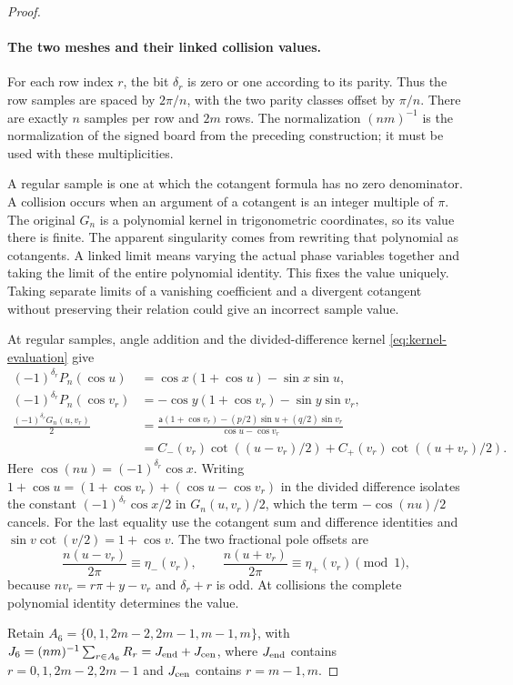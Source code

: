 \begin{proof}
\paragraph{The two meshes and their linked collision values.}
For each row index $r$, the bit $\delta_r$ is zero or one according
to its parity. Thus the row samples are spaced by $2\pi/n$, with
the two parity classes offset by $\pi/n$. There are exactly $n$
samples per row and $2m$ rows. The normalization $(nm)^{-1}$ is the
normalization of the signed board from the preceding construction;
it must be used with these multiplicities.

A regular sample is one at which the cotangent formula has no zero
denominator. A collision occurs when an argument of a cotangent is an
integer multiple of $\pi$. The original $G_n$ is a polynomial kernel
in trigonometric coordinates, so its value there is finite. The apparent
singularity comes from rewriting that polynomial as cotangents. A
linked limit means varying the actual phase variables together and
taking the limit of the entire polynomial identity. This fixes the
value uniquely. Taking separate limits of a vanishing coefficient and
a divergent cotangent without preserving their relation could give an
incorrect sample value.

At regular samples, angle addition and the divided-difference kernel
\eqref{eq:kernel-evaluation} give
\[
 \begin{aligned}
 (-1)^{\delta_r}P_n(\cos u)&=\cos x(1+\cos u)-\sin x\sin u,\\
 (-1)^{\delta_r}P_n(\cos v_r)&=-\cos y(1+\cos v_r)-\sin y\sin v_r,\\
 \frac{(-1)^{\delta_r}G_n(u,v_r)}2
 &=\frac{\mathsf a(1+\cos v_r)-(p/2)\sin u+(q/2)\sin v_r}
          {\cos u-\cos v_r}\\
 &=C_-(v_r)\cot((u-v_r)/2)+C_+(v_r)\cot((u+v_r)/2).
 \end{aligned}
\]
Here $\cos(nu)=(-1)^{\delta_r}\cos x$.
Writing $1+\cos u=(1+\cos v_r)+(\cos u-\cos v_r)$ in the divided
difference isolates the constant $(-1)^{\delta_r}\cos x/2$ in
$G_n(u,v_r)/2$, which the term $-\cos(nu)/2$ cancels.
For the last equality use the cotangent sum and difference identities
and $\sin v\cot(v/2)=1+\cos v$. The two fractional pole offsets are
\[
 \frac{n(u-v_r)}{2\pi}\equiv\eta_-(v_r),\qquad
 \frac{n(u+v_r)}{2\pi}\equiv\eta_+(v_r)\pmod1,
\]
because $nv_r=r\pi+y-v_r$ and $\delta_r+r$ is odd.
At collisions the complete polynomial identity determines the value.

Retain
$A_6=\{0,1,2m-2,2m-1,m-1,m\}$, with
$J_6=(nm)^{-1}\sum_{r\in A_6}R_r=J_{\rm end}+J_{\rm cen}$,
where $J_{\rm end}$ contains $r=0,1,2m-2,2m-1$ and
$J_{\rm cen}$ contains $r=m-1,m$.


\end{proof}
